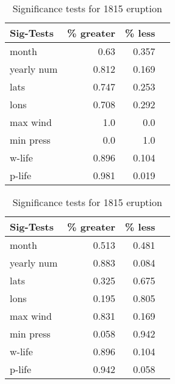 \documentclass[phd,tocprelim]{cornell}
\begin{document}
\begin{table}[!tbp]
\centering
\begin{minipage}[b]{0.45\textwidth}
\begin{tabular}{lrrr}
\toprule
             Sig-Tests & \% greater &  \% less \\

\midrule

month & 0.63 & 0.357 \\
yearly num & 0.812 & 0.169 \\
lats & 0.747 & 0.253 \\
lons & 0.708 & 0.292 \\
max wind & 1.0 & 0.0 \\
min press & 0.0 & 1.0 \\
w-life & 0.896 & 0.104 \\
p-life & 0.981 & 0.019 \\

\bottomrule
\end{tabular}
\caption{Significance tests for 1213 eruption}
\label{sig:1213}
\end{minipage}
\hfill
\begin{minipage}[b]{0.45\textwidth}
\begin{tabular}{lrrr}
\toprule
             Sig-Tests & \% greater &  \% less \\
\midrule

month & 0.513 & 0.481 \\
yearly num & 0.883 & 0.084 \\
lats & 0.325 & 0.675 \\
lons & 0.195 & 0.805 \\
max wind & 0.831 & 0.169 \\
min press & 0.058 & 0.942 \\
w-life & 0.896 & 0.104 \\
p-life & 0.942 & 0.058 \\

\bottomrule
\end{tabular}
\caption{Significance tests for 1815 eruption}
\label{sig:1815}
\end{minipage}
\end{table}
\end{document}
